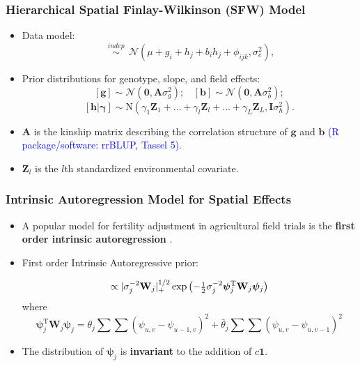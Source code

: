 \documentclass{beamer}
\newcommand{\bA}{\mathbf{A}}
\newcommand{\bphi}{{\bm\phi}}
\newcommand{\bpsi}{{\bm\psi}}
\newcommand{\bW}{\mathbf{W}}
\newcommand{\sT}{\mathrm{T}}
\newcommand{\bZ}{\mathbf{Z}}
\newcommand{\shalf}{\mbox{{\footnotesize$\frac{1}{2}$}}}
\begin{document}
\begin{frame}
	\frametitle{Hierarchical Spatial Finlay-Wilkinson (SFW) Model}
	\begin{itemize}
	\item Data model:
\begin{equation*}
[y_{ijk} | \mu, \mathbf{g}, \mathbf{b}, \mathbf{h}, \bphi ] \ \ \overset{indep}{\sim} \ \  \mathcal{N}(\mu + g_i + h_j + b_i h_j + \phi_{ijk}, \sigma_e^2),
\end{equation*}

	\item Prior distributions for genotype, slope, and field effects:
	$$  [\mathbf{g}] \sim \mathcal{N}(\bm{0}, \bA \sigma_g^2); \ \ \ \ [\mathbf{b}] \sim \mathcal{N}(\bm{0}, \bA \sigma_b^2); $$
        $$[\mathbf{h}|\bm{\gamma}] \sim \mathrm{N}( \gamma_1 \bZ_1 + \dots + \gamma_l \bZ_l + \dots + \gamma_L \bZ_L
         , \mathbf{I} \sigma_h^2).$$
         \item $\bA$ is the kinship matrix describing the correlation structure of $\mathbf{g}$ and $\mathbf{b}$ \textcolor{blue}{(R package/software: rrBLUP, Tassel 5)}.
	\item $\bZ_{l}$ is the $l$th standardized environmental covariate.
	\end{itemize}
\end{frame}


\begin{frame}
	\frametitle{Intrinsic Autoregression Model for Spatial Effects}
	\begin{itemize}
	\item A popular model for fertility adjustment in agricultural field trials is the \textbf{first order intrinsic autoregression} \citep{besag1999bayesian,dutt:mond:2015}.

\item First order Intrinsic Autoregressive prior:

\begin{equation*}
[\bpsi_j|\theta_j,\sigma^2_j] \propto |\sigma^{-2}_j\bW_j|_+^{1/2}\exp\left( -\shalf\sigma^{-2}_j\bpsi_j^\sT \bW_j\bpsi_j\right)
\end{equation*}
where
\[\bpsi_j^\sT \bW_j\bpsi_j = \theta_j\sum\sum(\psi_{u,v} - \psi_{u-1,v})^2 + {\bar\theta}_j\sum\sum(\psi_{u,v} - \psi_{u,v-1})^2\]

\item  The distribution of $\pmb{\psi}_j$ is \textbf{invariant} to the addition of $c \bm{1}$.

	\end{itemize}

\end{frame}
\end{document}
